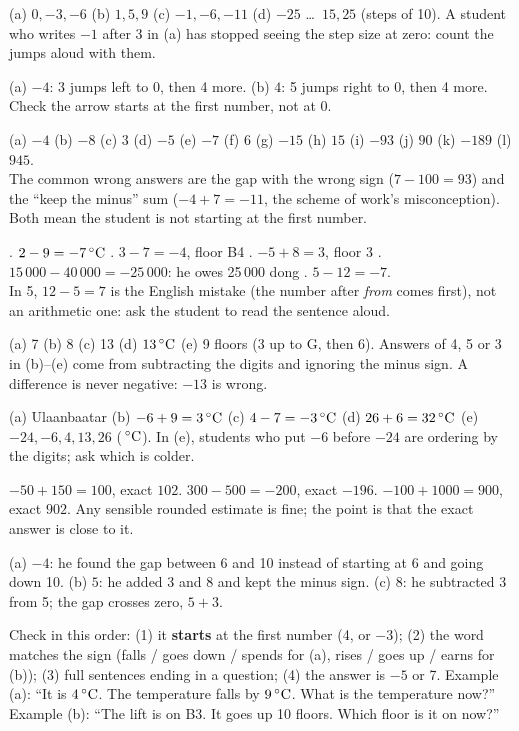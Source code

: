 \documentclass[12pt,a4paper]{article}
\begin{document}
\noindent (a) $0, -3, -6$ \quad (b) $1, 5, 9$ \quad (c) $-1, -6, -11$ \quad
(d) $-25$ \ldots\ $15, 25$ (steps of 10). A student who writes $-1$ after $3$ in (a)
has stopped seeing the step size at zero: count the jumps aloud with them.

\noindent (a) $-4$: 3 jumps left to 0, then 4 more. \quad (b) $4$: 5 jumps right to 0,
then 4 more. Check the arrow starts at the first number, not at 0.

\noindent (a) $-4$ (b) $-8$ (c) $3$ (d) $-5$ (e) $-7$ (f) $6$ (g) $-15$ (h) $15$
(i) $-93$ (j) $90$ (k) $-189$ (l) $945$. \\
The common wrong answers are the gap with the wrong sign ($7-100=93$) and the
``keep the minus'' sum ($-4+7=-11$, the scheme of work's misconception). Both mean
the student is not starting at the first number.

. $2-9=-7\,^{\circ}\mathrm{C}$ . $3-7=-4$, floor B4 . $-5+8=3$, floor 3 . $15\,000-40\,000=-25\,000$: he owes 25\,000 dong . $5-12=-7$. \\
In 5, $12-5=7$ is the English mistake (the number after \textit{from} comes first),
not an arithmetic one: ask the student to read the sentence aloud.

\noindent (a) 7 \quad (b) 8 \quad (c) 13 \quad (d) $13\,^{\circ}\mathrm{C}$ \quad (e) 9 floors (3 up to
G, then 6). Answers of 4, 5 or 3 in (b)--(e) come from subtracting the digits and
ignoring the minus sign. A difference is never negative: $-13$ is wrong.

\noindent (a) Ulaanbaatar \quad (b) $-6+9=3\,^{\circ}\mathrm{C}$ \quad (c) $4-7=-3\,^{\circ}\mathrm{C}$ \quad
(d) $26+6=32\,^{\circ}\mathrm{C}$ \quad (e) $-24, -6, 4, 13, 26$ ($\,^{\circ}\mathrm{C}$). In (e), students who put $-6$
before $-24$ are ordering by the digits; ask which is colder.

\noindent $-50+150=100$, exact $102$. \quad $300-500=-200$, exact $-196$. \quad
$-100+1000=900$, exact $902$. Any sensible rounded estimate is fine; the point is that
the exact answer is close to it.

\noindent (a) $-4$: he found the gap between 6 and 10 instead of starting at 6 and going
down 10. (b) $5$: he added 3 and 8 and kept the minus sign. (c) $8$: he subtracted 3
from 5; the gap crosses zero, $5+3$.

\noindent Check in this order: (1) it \textbf{starts} at the first number (4, or $-3$);
(2) the word matches the sign (falls / goes down / spends for (a), rises / goes up /
earns for (b)); (3) full sentences ending in a question; (4) the answer is $-5$ or 7.
Example (a): ``It is $4\,^{\circ}\mathrm{C}$. The temperature falls by $9\,^{\circ}\mathrm{C}$. What is the temperature
now?'' Example (b): ``The lift is on B3. It goes up 10 floors. Which floor is it on now?''

\fi
\end{document}
